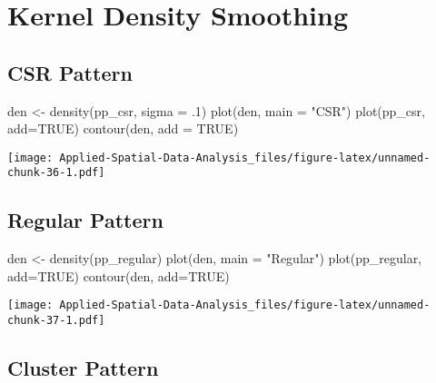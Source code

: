 \documentclass[
]{book}
\newenvironment{Shaded}{\begin{snugshade}}{\end{snugshade}}
\newcommand{\AttributeTok}[1]{\textcolor[rgb]{0.77,0.63,0.00}{#1}}
\newcommand{\ConstantTok}[1]{\textcolor[rgb]{0.00,0.00,0.00}{#1}}
\newcommand{\DecValTok}[1]{\textcolor[rgb]{0.00,0.00,0.81}{#1}}
\newcommand{\FunctionTok}[1]{\textcolor[rgb]{0.00,0.00,0.00}{#1}}
\newcommand{\NormalTok}[1]{#1}
\newcommand{\OtherTok}[1]{\textcolor[rgb]{0.56,0.35,0.01}{#1}}
\newcommand{\StringTok}[1]{\textcolor[rgb]{0.31,0.60,0.02}{#1}}
\begin{document}
\hypertarget{kernel-density-smoothing}{%
\section{Kernel Density Smoothing}\label{kernel-density-smoothing}}

\hypertarget{csr-pattern}{%
\subsection{CSR Pattern}\label{csr-pattern}}

\begin{Shaded}
\begin{Highlighting}[]
\NormalTok{den }\OtherTok{\textless{}{-}} \FunctionTok{density}\NormalTok{(pp\_csr, }\AttributeTok{sigma =}\NormalTok{ .}\DecValTok{1}\NormalTok{)}
\FunctionTok{plot}\NormalTok{(den, }\AttributeTok{main =} \StringTok{"CSR"}\NormalTok{)}
\FunctionTok{plot}\NormalTok{(pp\_csr, }\AttributeTok{add=}\ConstantTok{TRUE}\NormalTok{)}
\FunctionTok{contour}\NormalTok{(den, }\AttributeTok{add =} \ConstantTok{TRUE}\NormalTok{)}
\end{Highlighting}
\end{Shaded}

\texttt{[image: Applied-Spatial-Data-Analysis\_files/figure-latex/unnamed-chunk-36-1.pdf]}

\hypertarget{regular-pattern}{%
\subsection{Regular Pattern}\label{regular-pattern}}

\begin{Shaded}
\begin{Highlighting}[]
\NormalTok{den }\OtherTok{\textless{}{-}} \FunctionTok{density}\NormalTok{(pp\_regular)}
\FunctionTok{plot}\NormalTok{(den, }\AttributeTok{main =} \StringTok{"Regular"}\NormalTok{)}
\FunctionTok{plot}\NormalTok{(pp\_regular, }\AttributeTok{add=}\ConstantTok{TRUE}\NormalTok{)}
\FunctionTok{contour}\NormalTok{(den, }\AttributeTok{add=}\ConstantTok{TRUE}\NormalTok{)}
\end{Highlighting}
\end{Shaded}

\texttt{[image: Applied-Spatial-Data-Analysis\_files/figure-latex/unnamed-chunk-37-1.pdf]}

\hypertarget{cluster-pattern}{%
\subsection{Cluster Pattern}\label{cluster-pattern}}
\end{document}
